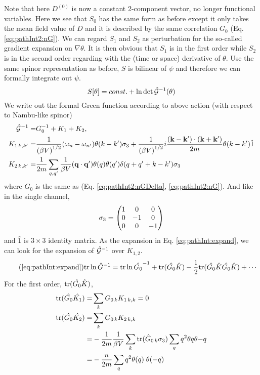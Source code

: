 Note that here $D^{(0)}$ is now a constant 2-component vector, no longer functional variables.  Here we see that $S_{0}$ has the same form as before except it only takes the mean field value of $D$ and it is described by the same correlation $G_{0}$ (Eq. \ref{eq:pathInt2:nG}).  We can regard $S_{1}$ and $S_{2}$ as perturbation for the so-called gradient expansion on $\nabla\theta$.  It is then obvious that $S_{1}$ is in the first order while $S_{2}$ is in the second order regarding with the (time or space) derivative of $\theta$.  Use the same spinor representation as before, $S$ is bilinear of $\psi$ and therefore we can formally integrate out $\psi$. 
\begin{equation}
S[\theta]=const.+\ln\det\hat{\mathcal{G}}^{-1}(\theta)
\end{equation}
 We write out the formal Green function according to above action (with respect to Nambu-like spinor)
\begin{subequations}
\begin{align}
\hat{\mathcal{G}}^{-1}=&G_{0}^{-1}+K_{1}+K_{2},\\
K_{1\, k,k'}=
	&\frac{1}{({\beta{}V)}^{1/2}}(\omega_n-\omega_{n'})\theta(k-k')\sigma_3+
		\frac{1}{{(\beta{}V)}^{1/2}}i\frac{(\mathbf{k}-\mathbf{k}')\cdot(\mathbf{k}+\mathbf{k}')}{2m}\theta(k-k')\hat{1}\\
K_{2\, k,k'}=
	&\frac{1}{2m}\sum_{q,q'}\frac{1}{{\beta{}V}}(\mathbf{q}\cdot\mathbf{q}')\theta(q)\theta(q')\delta(q+q'+k-k')\sigma_3
\end{align}
\end{subequations}
where $G_{0}$ is the same as (Eq. \eqref{eq:pathInt2:nGDelta}, \eqref{eq:pathInt2:nG}).  And like in the single channel, 
\begin{equation}
\sigma_3=\begin{pmatrix}1&0&0\\0&-1&0\\0&0&-1\end{pmatrix}
\end{equation}
and $\hat{1}$ is $3\times3$ identity matrix.  As the expansion in Eq. \ref{eq:pathInt:expand}, we can look for the expansion of $\hat{\mathcal{G}}^{-1}$ over $K_{1,2}$.  
\begin{equation}\tag{\ref{eq:pathInt:expand}}
\tr\ln \hat{G}^{-1}=\tr\ln\hat{G_{0}}^{-1}+\tr(\hat{G_{0}}\hat{K})-\nth{2}\tr(\hat{G_{0}}\hat{K}\hat{G_{0}}\hat{K})+\cdots
\end{equation}
For the first order, $\text{tr}(\hat{G_{0}}\hat{K})$, 
\begin{align}
\text{tr}(\hat{G_{0}}\hat{K_1})=&\sum_{k}{G_{0\,k}K_{1\,k,k}}=0\\
\text{tr}(\hat{G_{0}}\hat{K_2})=&\sum_{k}{G_{0\,k}K_{2\,k,k}}\nonumber\\
	=&-\frac{1}{2m}\frac{1}{{\beta{}V}}\sum_{k}\text{tr}(\hat{G}_{0\,k}\sigma_3)\sum_{q}q^2\theta{q}\theta{-q}\nonumber\\
	=&-\frac{n}{2m}\sum_{q}q^2\theta{(q)}\;\theta{(-q)}
\end{align}
